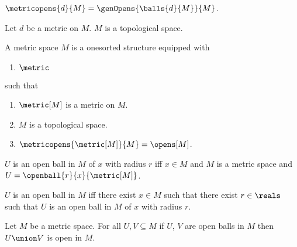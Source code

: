 \begin{definition}\label{metricopens}
    $\metricopens{d}{M} = \genOpens{\balls{d}{M}}{M}$.
\end{definition}


\begin{theorem}
    Let $d$ be a metric on $M$.
    $M$ is a topological space.
\end{theorem}






\begin{struct}\label{metric_space}  
    A metric space $M$ is a onesorted structure equipped with
    \begin{enumerate}
        \item $\metric$
    \end{enumerate}
    such that
    \begin{enumerate}
        \item \label{metric_space_metric}                   $\metric[M]$ is a metric on $M$.
        \item \label{metric_space_topology}                 $M$ is a topological space.
        \item \label{metric_space_opens}                    $\metricopens{ \metric[M] }{M} = \opens[M]$.
    \end{enumerate}
\end{struct}

\begin{abbreviation}\label{descriptive_syntax_for_openball1}
    $U$ is an open ball in $M$ of $x$ with radius $r$ iff $x \in M$ and $M$ is a metric space and $U = \openball{r}{x}{\metric[M]}$.
\end{abbreviation}

\begin{abbreviation}\label{descriptive_syntax_for_openball2}
    $U$ is an open ball in $M$ iff there exist $x \in M$ such that there exist $r \in \reals$ such that $U$ is an open ball in $M$ of $x$ with radius $r$.
\end{abbreviation}

\begin{lemma}\label{union_of_open_balls_is_open}
    Let $M$ be a metric space.
    For all $U,V \subseteq M$ if $U$, $V$ are open balls in $M$ then $U \union V$ is open in $M$.
\end{lemma}


